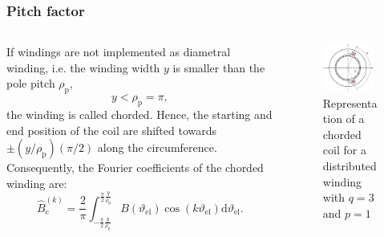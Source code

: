 \begin{frame}
	\frametitle{Pitch factor}
    \begin{columns}
		\begin{column}{0.6\textwidth}
	        If windings are not implemented as diametral winding, i.e. the winding width $y$ is smaller than the pole pitch $\rho_\mathrm{p}$, 
            $$y < \rho_\mathrm{p}=\pi,$$
            the winding is called chorded. Hence, the starting and end position of the coil are shifted towards $\pm(y/\rho_\mathrm{p})(\pi/2)$ along the circumference. Consequently, the Fourier coefficients of the chorded winding are:
            \begin{equation}
                \hat{B}_{\mathrm{c}}^{(k)} = \frac{2}{\pi} \int_{-\frac{\pi}{2}\frac{y}{\rho_\mathrm{p}}}^{\frac{\pi}{2}\frac{y}{\rho_\mathrm{p}}} B(\vartheta_\mathrm{el}) \cos(k \vartheta_\mathrm{el}) \mathrm{d}\vartheta_\mathrm{el}.
                \label{eq:Pitch_factor_fourier_coefficients}
            \end{equation}
        \end{column}
        \begin{column}{0.4\textwidth}
            \begin{figure}
                \centering
                \includegraphics[width=0.9\textwidth]{fig/lec05/Single_phase_chording.pdf}
                \caption{Representation of a chorded coil for a distributed winding with $q=3$ and $p=1$}
                \label{fig:Single_phase_chording}
            \end{figure}
        \end{column}
    \end{columns}
\end{frame}

